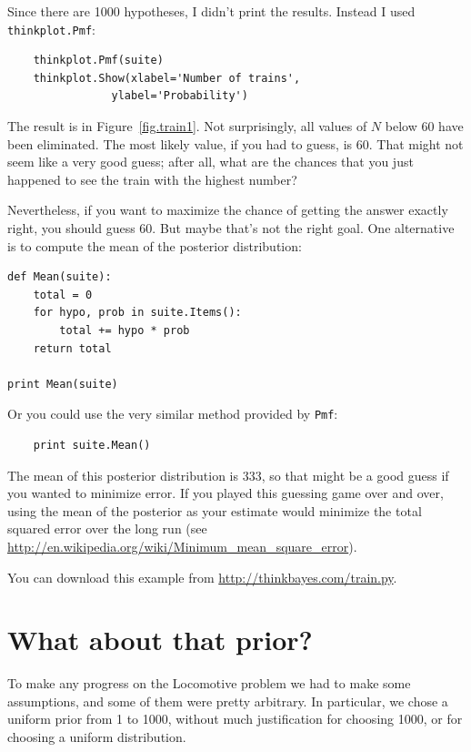 \documentclass[12pt]{book}
\begin{document}
Since there are 1000 hypotheses, I didn't print the results.
Instead I used {\tt thinkplot.Pmf}:

\begin{verbatim}
    thinkplot.Pmf(suite)
    thinkplot.Show(xlabel='Number of trains',
                ylabel='Probability')
\end{verbatim}

The result is in Figure~\ref{fig.train1}.  Not surprisingly, all
values of $N$ below 60 have been eliminated.  The most likely
value, if you had to guess, is 60.  That might not seem like
a very good guess; after all, what are the chances that you just
happened to see the train with the highest number?

Nevertheless, if you want to maximize the chance of getting
the answer exactly right, you should guess 60.  But maybe that's
not the right goal.  One alternative is to compute the
mean of the posterior distribution:

\begin{verbatim}
def Mean(suite): 
    total = 0
    for hypo, prob in suite.Items():
        total += hypo * prob
    return total

print Mean(suite)
\end{verbatim}

Or you could use the very similar method provided by {\tt Pmf}:

\begin{verbatim}
    print suite.Mean()
\end{verbatim}

The mean of this posterior distribution is 333, so that might be a
good guess if you wanted to minimize error.  If you played this
guessing game over and over, using the mean of the posterior as your
estimate would minimize the total squared error over the long run (see
\url{http://en.wikipedia.org/wiki/Minimum_mean_square_error}).

You can download this example from \url{http://thinkbayes.com/train.py}.


\section{What about that prior?}

To make any progress on the Locomotive problem we had to make
some assumptions, and some of them were pretty arbitrary.  In
particular, we chose a uniform prior from 1 to 1000, without
much justification for choosing 1000, or for choosing a uniform
distribution.
\end{document}
